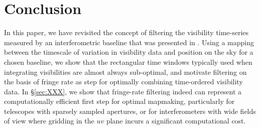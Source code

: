 \documentclass[twocolumn,apj,numberedappendix]{emulateapj}
\begin{document}

\section{Conclusion}
\label{sec:conclusion}

In this paper, we have revisited the concept of filtering the visibility time-series
measured by an interferometric baseline that was presented in \citet{parsons_backer2009}.
Using a mapping between the timescale of variation in visibility data and position
on the sky for a chosen baseline, we show that the rectangular time windows typically
used when integrating visibilities are almost always sub-optimal, and motivate 
filtering on the basis of fringe rate
as step for optimally combining time-ordered visibility data.  In \S\ref{sec:XXX}, we show 
that fringe-rate filtering indeed can represent a computationally efficient first step
for optimal mapmaking, particularly for telescopes with sparsely sampled apertures, or
for interferometers with wide fields of view where gridding in the $uv$ plane incurs a significant
computational cost.
\end{document}
